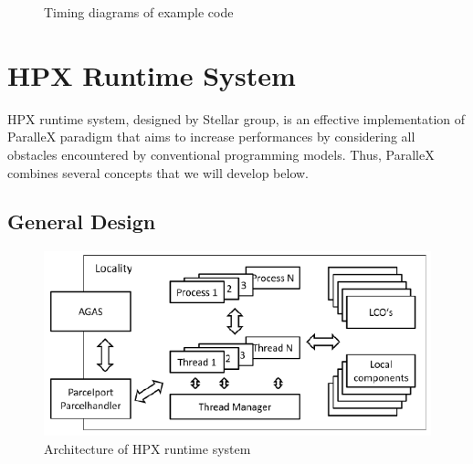 \documentclass[smallextended]{svjour3}
\begin{document}
\begin{figure}[h]
	\centering
	\hspace{0.5cm}
	\caption{Timing diagrams of example code}
	\label{chronofuture}
\end{figure}

\section{HPX Runtime System}\label{HPX}
HPX runtime system, designed by Stellar group, is an effective implementation of ParalleX paradigm that aims to increase performances by considering all obstacles encountered by conventional programming models. Thus, ParalleX combines several concepts that we will develop below.

\subsection{General Design}

\begin{figure}[h]
\begin{center}
\includegraphics[scale=0.55]{Images/Im4.png}
\end{center}
\caption{Architecture of HPX runtime system}
\label{ArchiHPX}
\end{figure}
\end{document}
